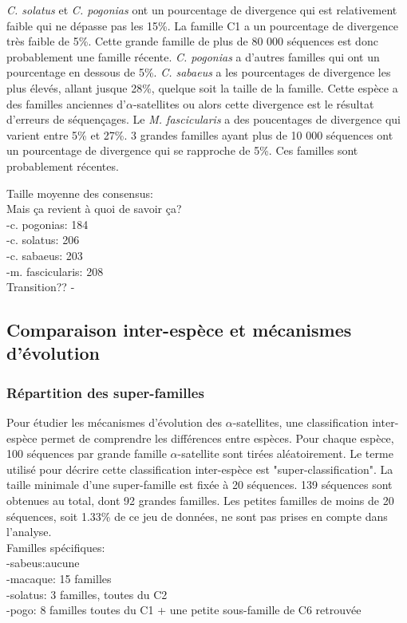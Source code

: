 \documentclass[12pt,a4paper]{article}
\begin{document}
	\textit{C. solatus} et \textit{C. pogonias} ont un pourcentage de divergence qui est relativement faible qui ne dépasse pas les 15\%. La  famille C1 a un pourcentage de divergence très faible de 5\%. Cette grande famille de plus de 80 000 séquences est donc probablement une famille récente.  \textit{C. pogonias} a d'autres familles qui ont un pourcentage en dessous de 5\%.
	\textit{C. sabaeus} a les pourcentages de divergence les plus élevés, allant jusque 28\%, quelque soit la taille de la famille. Cette espèce a des familles anciennes d'$\alpha$-satellites ou alors cette divergence est le résultat d'erreurs de séquençages. Le \textit{M. fascicularis} a des poucentages de divergence qui varient entre 5\% et 27\%. 3 grandes familles ayant plus de 10 000 séquences ont un pourcentage de divergence qui se rapproche de 5\%. Ces familles sont probablement récentes.
	
	Taille moyenne des consensus:\\ Mais ça revient à quoi de savoir ça?\\
	-c. pogonias: 184\\
	-c. solatus: 206\\
	-c. sabaeus: 203\\
	-m. fascicularis: 208\\

Transition??
-

	
	\subsection{Comparaison inter-espèce et mécanismes d'évolution}
	\subsubsection{Répartition des super-familles}
				Pour étudier les mécanismes d'évolution des $\alpha$-satellites, une classification inter-espèce permet de comprendre les différences entre espèces. Pour chaque espèce, 100 séquences par grande famille  $\alpha$-satellite sont tirées aléatoirement. Le terme utilisé pour décrire cette classification inter-espèce est "super-classification". La taille minimale d'une super-famille est fixée à 20 séquences. 139 séquences sont obtenues au total, dont 92 grandes familles. Les petites familles de moins de 20 séquences, soit 1.33\% de ce jeu de données, ne sont pas prises en compte dans l'analyse.  \\
							
				
				Familles spécifiques:\\
				-sabeus:aucune\\
				-macaque: 15 familles\\
				-solatus: 3 familles, toutes du C2\\
				-pogo: 8 familles toutes du C1 + une petite sous-famille de C6 retrouvée\\
				
\end{document}
